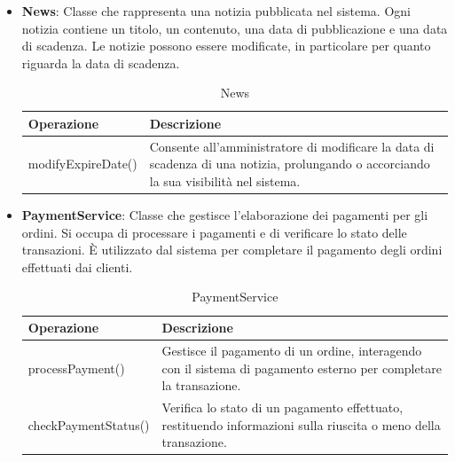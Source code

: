 \begin{itemize}
    \item \textbf{News}:
Classe che rappresenta una notizia pubblicata nel sistema. Ogni notizia contiene un titolo, un contenuto, una data di pubblicazione e una data di scadenza. Le notizie possono essere modificate, in particolare per quanto riguarda la data di scadenza.
\begin{table}[!htbp]
    \centering
    \begin{tabularx}{0.9\textwidth}{ >{\centering\arraybackslash}m{4cm} | X  } 
    \hline
         \textbf{Operazione} & \textbf{Descrizione} \\
         \hline
         modifyExpireDate() & Consente all'amministratore di modificare la data di scadenza di una notizia, prolungando o accorciando la sua visibilità nel sistema. \\
         \hline
    \end{tabularx}
    \caption{News}
\end{table}


\item \textbf{PaymentService}:
Classe che gestisce l'elaborazione dei pagamenti per gli ordini. Si occupa di processare i pagamenti e di verificare lo stato delle transazioni. È utilizzato dal sistema per completare il pagamento degli ordini effettuati dai clienti.
\begin{table}[!htbp]
    \centering
    \begin{tabularx}{0.9\textwidth}{ >{\centering\arraybackslash}m{4cm} | X  } 
    \hline
         \textbf{Operazione} & \textbf{Descrizione} \\
         \hline
         processPayment() & Gestisce il pagamento di un ordine, interagendo con il sistema di pagamento esterno per completare la transazione. \\
         \hline
         checkPaymentStatus() & Verifica lo stato di un pagamento effettuato, restituendo informazioni sulla riuscita o meno della transazione. \\
         \hline
    \end{tabularx}
    \caption{PaymentService}
\end{table}


\end{itemize}
